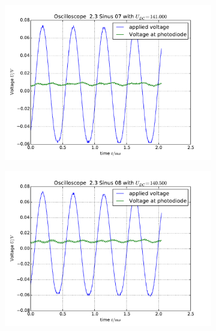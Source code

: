 \begin{figure}
    \begin{subfigure}[b]{\picwidth}
        \includegraphics[width=\textwidth]{analysis/figures/23sinus07}
        \caption{}
    \end{subfigure}\qquad
    \begin{subfigure}[b]{\picwidth}
        \includegraphics[width=\textwidth]{analysis/figures/23sinus08}
        \caption{}
    \end{subfigure}
    \begin{subfigure}[b]{\picwidth}

\end{subfigure}
\end{figure}
